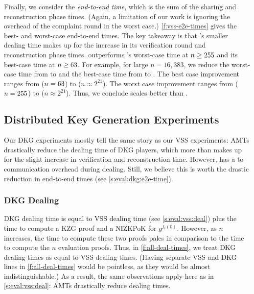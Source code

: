 Finally, we consider the \textit{end-to-end time}, which is the sum of the sharing and reconstruction phase times.
(Again, a limitation of our work is ignoring the overhead of the complaint round in the worst case.)
\cref{f:vss-e2e-times} gives the best- and worst-case end-to-end times.
The key takeaway is that \ourvss's smaller dealing time makes up for the increase in its verification round and reconstruction phase times.
\ourvss outperforms \evss's worst-case time at $n\ge 255$ and its best-case time at $n\ge 63$.
For example, for large $n=16,383$, we reduce the worst-case time from  to  and the best-case time from  to .
The best case improvement ranges from \amtVssEndToEndBcTimeImprovOverevss{\vssOutperformBcN} ($n=63$) to  ($n\approx 2^{21}$).
The worst case improvement ranges from \amtVssEndToEndWcTimeImprovOverevss{\vssOutperformWcN} ($n=255$) to  ($n\approx 2^{21}$).
Thus, we conclude \ourvss scales better than \evss.

\subsection{Distributed Key Generation Experiments}
\label{s:eval:dkg}

Our DKG experiments mostly tell the same story as our VSS experiments:
AMTs drastically reduce the dealing time of DKG players, which more than makes up for the slight increase in verification and reconstruction time.
However, \ourdkg has a  to  communication overhead during dealing.
Still, we believe this is worth the drastic reduction in end-to-end times (see \cref{s:eval:dkg:e2e-time}).

\subsubsection{DKG Dealing}
DKG dealing time is equal to VSS dealing time (see \cref{s:eval:vss:deal}) plus the time to compute a KZG proof and a NIZKPoK for $g^{f_i(0)}$.
However, as $n$ increases, the time to compute these two proofs pales in comparison to the time to compute the $n$ evaluation proofs.
Thus, in \cref{f:all-deal-times}, we treat DKG dealing times as equal to VSS dealing times.
(Having separate VSS and DKG lines in \cref{f:all-deal-times} would be pointless, as they would be almost indistinguishable.)
As a result, the same observations apply here as in \cref{s:eval:vss:deal}: AMTs drastically reduce dealing times.

